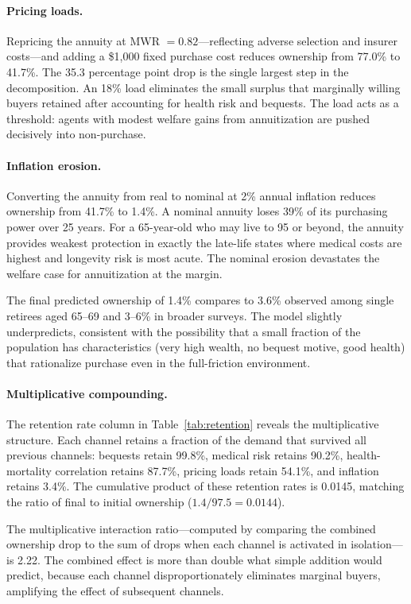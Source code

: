 \documentclass[12pt]{article}
\begin{document}
\paragraph{Pricing loads.} Repricing the annuity at MWR $= 0.82$---reflecting adverse selection and insurer costs---and adding a \$1,000 fixed purchase cost reduces ownership from 77.0\% to 41.7\%. The 35.3 percentage point drop is the single largest step in the decomposition. An 18\% load eliminates the small surplus that marginally willing buyers retained after accounting for health risk and bequests. The load acts as a threshold: agents with modest welfare gains from annuitization are pushed decisively into non-purchase.

\paragraph{Inflation erosion.} Converting the annuity from real to nominal at 2\% annual inflation reduces ownership from 41.7\% to 1.4\%. A nominal annuity loses 39\% of its purchasing power over 25 years. For a 65-year-old who may live to 95 or beyond, the annuity provides weakest protection in exactly the late-life states where medical costs are highest and longevity risk is most acute. The nominal erosion devastates the welfare case for annuitization at the margin.

The final predicted ownership of 1.4\% compares to 3.6\% observed among single retirees aged 65--69 \citep{lockwood2012} and 3--6\% in broader surveys. The model slightly underpredicts, consistent with the possibility that a small fraction of the population has characteristics (very high wealth, no bequest motive, good health) that rationalize purchase even in the full-friction environment.

\paragraph{Multiplicative compounding.} The retention rate column in Table~\ref{tab:retention} reveals the multiplicative structure. Each channel retains a fraction of the demand that survived all previous channels: bequests retain 99.8\%, medical risk retains 90.2\%, health-mortality correlation retains 87.7\%, pricing loads retain 54.1\%, and inflation retains 3.4\%. The cumulative product of these retention rates is 0.0145, matching the ratio of final to initial ownership ($1.4/97.5 = 0.0144$).

The multiplicative interaction ratio---computed by comparing the combined ownership drop to the sum of drops when each channel is activated in isolation---is 2.22. The combined effect is more than double what simple addition would predict, because each channel disproportionately eliminates marginal buyers, amplifying the effect of subsequent channels.
\end{document}
